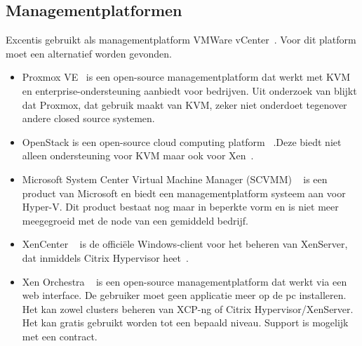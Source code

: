 \subsection{Managementplatformen}\label{subsec:managementplatformen}
Excentis gebruikt als managementplatform VMWare vCenter~\autocite{vmware}. Voor dit platform moet een alternatief worden gevonden.

\begin{itemize}
    \item Proxmox VE~\autocite{Proxmox} is een open-source managementplatform dat werkt met KVM en enterprise-ondersteuning aanbiedt voor bedrijven. Uit onderzoek van \textcite{ally2018comparative} blijkt dat Proxmox, dat gebruik maakt van KVM, zeker niet onderdoet tegenover andere closed source systemen.

    \item OpenStack is een open-source cloud computing platform ~\autocite{openstack2024}.Deze biedt niet alleen ondersteuning voor KVM maar ook voor Xen~\autocite{oleksiuk2023comparative}.

    \item Microsoft System Center Virtual Machine Manager (SCVMM) ~\autocite{microsoftvmm2025} is een product van Microsoft en biedt een managementplatform systeem aan voor Hyper-V. Dit product bestaat nog maar in beperkte vorm en is niet meer meegegroeid met de node van een gemiddeld bedrijf.

    \item XenCenter ~\autocite{xencenter2024} is de officiële Windows‑client voor het beheren van XenServer, dat inmiddels Citrix Hypervisor heet~\autocite{xenserverwebsite}.

    \item Xen Orchestra ~\autocite{el2021server} is een open-source managementplatform dat werkt via een web interface. De gebruiker moet geen applicatie meer op de pc installeren. Het kan zowel clusters beheren van XCP-ng of Citrix Hypervisor/XenServer. Het kan gratis gebruikt worden tot een bepaald niveau. Support is mogelijk met een contract.
\end{itemize}

